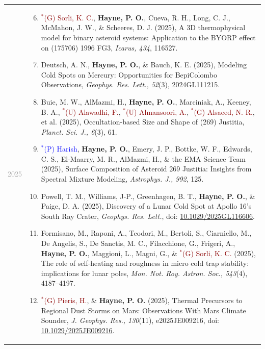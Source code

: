 \documentclass[letterpaper,10pt,twoside]{article}
\begin{document}
\begin{longtable}{@{} p{} p{}}
\noindent\textcolor{darkgray}{2025} &
        \begin{enumerate}[leftmargin=!,labelindent=2.5pt,itemindent=-10pt]\setcounter{enumi}{5}
            \item{\small \textcolor{darkred}{$^*$(G) Sorli, K. C.}, \textbf{Hayne, P. O.}, Cueva, R. H., Long, C. J., McMahon, J. W., \& Scheeres, D. J. (2025), A 3D thermophysical model for binary asteroid systems: Application to the BYORP effect on (175706) 1996 FG3, \textit{Icarus, 434}, 116527.
            }
            \item{\small Deutsch, A. N., \textbf{Hayne, P. O.}, \& Bauch, K. E. (2025), Modeling Cold Spots on Mercury: Opportunities for BepiColombo Observations, \textit{Geophys. Res. Lett., 52}(3), 2024GL111215.
            }
            \item{\small Buie, M. W., AlMazmi, H., \textbf{Hayne, P. O.}, Marciniak, A., Keeney, B. A., \textcolor{darkred}{$^*$(U) Alawadhi, F.}, \textcolor{darkred}{$^*$(U) Almansoori, A.}, \textcolor{darkred}{$^*$(G) Alsaeed, N. R.}, et al. (2025), Occultation-based Size and Shape of (269) Justitia, \textit{Planet. Sci. J., 6}(3), 61.
            }
            \item{\small \textcolor{blue}{$^*$(P) Harish}, \textbf{Hayne, P. O.}, Emery, J. P., Bottke, W. F., Edwards, C. S., El-Maarry, M. R., AlMazmi, H., \& the EMA Science Team (2025), Surface Composition of Asteroid 269 Justitia: Insights from Spectral Mixture Modeling, \textit{Astrophys. J., 992}, 125.
            }
            \item{\small Powell, T. M., Williams, J-P., Greenhagen, B. T., \textbf{Hayne, P. O.}, \& Paige, D. A. (2025), Discovery of a Lunar Cold Spot at Apollo 16's South Ray Crater, \textit{Geophys. Res. Lett.}, doi: \href{https://doi.org/10.1029/2025GL116606}{10.1029/2025GL116606}.
            }
            \item{\small Formisano, M., Raponi, A., Teodori, M., Bertoli, S., Ciarniello, M., De Angelis, S., De Sanctis, M. C., Filacchione, G., Frigeri, A., \textbf{Hayne, P. O.}, Maggioni, L., Magni, G., \& \textcolor{darkred}{$^*$(G) Sorli, K. C.} (2025), The role of self-heating and roughness in micro cold trap stability: implications for lunar poles, \textit{Mon. Not. Roy. Astron. Soc., 543}(4), 4187--4197.
            }
            \item{\small \textcolor{darkred}{$^*$(G) Pieris, H.}, \& \textbf{Hayne, P. O.} (2025), Thermal Precursors to Regional Dust Storms on Mars: Observations With Mars Climate Sounder, \textit{J. Geophys. Res., 130}(11), e2025JE009216, doi: \href{https://doi.org/10.1029/2025JE009216}{10.1029/2025JE009216}.
}
\end{enumerate}
\end{longtable}
\end{document}
